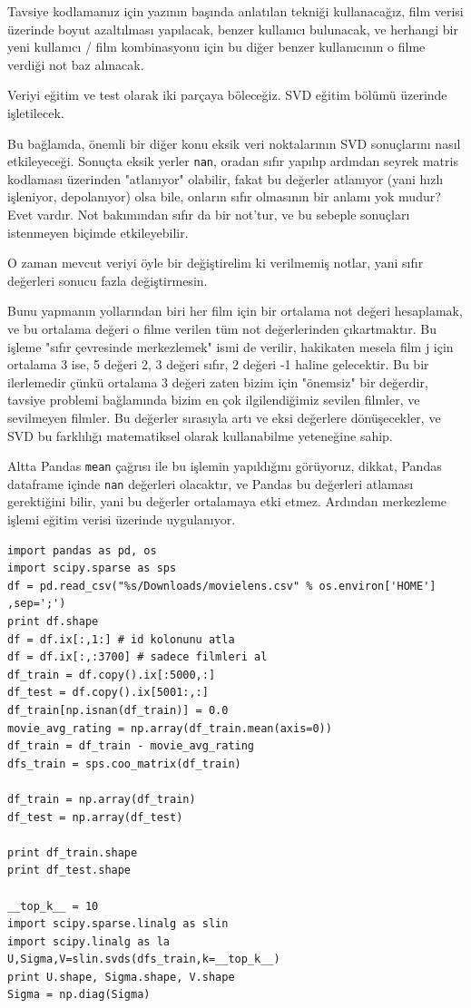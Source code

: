 \documentclass[12pt,fleqn]{article}\usepackage{../../common}
\begin{document}
Tavsiye kodlamamız için yazının başında anlatılan tekniği kullanacağız, film
verisi üzerinde boyut azaltılması yapılacak, benzer kullanıcı bulunacak, ve
herhangi bir yeni kullanıcı / film kombinasyonu için bu diğer benzer
kullanıcının o filme verdiği not baz alınacak.

Veriyi eğitim ve test olarak iki parçaya böleceğiz. SVD eğitim bölümü
üzerinde işletilecek.

Bu bağlamda, önemli bir diğer konu eksik veri noktalarının SVD
sonuçlarını nasıl etkileyeceği. Sonuçta eksik yerler \verb!nan!,
oradan sıfır yapılıp ardından seyrek matris kodlaması üzerinden
"atlanıyor" olabilir, fakat bu değerler atlanıyor (yani hızlı
işleniyor, depolanıyor) olsa bile, onların sıfır olmasının bir anlamı
yok mudur? Evet vardır. Not bakımından sıfır da bir not'tur, ve bu
sebeple sonuçları istenmeyen biçimde etkileyebilir.

O zaman mevcut veriyi öyle bir değiştirelim ki verilmemiş notlar, yani
sıfır değerleri sonucu fazla değiştirmesin.

Bunu yapmanın yollarından biri her film için bir ortalama not değeri
hesaplamak, ve bu ortalama değeri o filme verilen tüm not
değerlerinden çıkartmaktır. Bu işleme "sıfır çevresinde merkezlemek"
ismi de verilir, hakikaten mesela film j için ortalama 3 ise, 5 değeri
2, 3 değeri sıfır, 2 değeri -1 haline gelecektir. Bu bir ilerlemedir
çünkü ortalama 3 değeri zaten bizim için "önemsiz" bir değerdir,
tavsiye problemi bağlamında bizim en çok ilgilendiğimiz sevilen
filmler, ve sevilmeyen filmler. Bu değerler sırasıyla artı ve eksi
değerlere dönüşecekler, ve SVD bu farklılığı matematiksel olarak
kullanabilme yeteneğine sahip.

Altta Pandas \verb!mean! çağrısı ile bu işlemin yapıldığını görüyoruz, dikkat,
Pandas dataframe içinde \verb!nan! değerleri olacaktır, ve Pandas bu değerleri
atlaması gerektiğini bilir, yani bu değerler ortalamaya etki etmez. Ardından
merkezleme işlemi eğitim verisi üzerinde uygulanıyor.

\begin{verbatim}
import pandas as pd, os
import scipy.sparse as sps
df = pd.read_csv("%s/Downloads/movielens.csv" % os.environ['HOME'] ,sep=';')
print df.shape
df = df.ix[:,1:] # id kolonunu atla
df = df.ix[:,:3700] # sadece filmleri al
df_train = df.copy().ix[:5000,:]
df_test = df.copy().ix[5001:,:]
df_train[np.isnan(df_train)] = 0.0
movie_avg_rating = np.array(df_train.mean(axis=0))
df_train = df_train - movie_avg_rating
dfs_train = sps.coo_matrix(df_train)

df_train = np.array(df_train)
df_test = np.array(df_test)

print df_train.shape
print df_test.shape

__top_k__ = 10
import scipy.sparse.linalg as slin
import scipy.linalg as la
U,Sigma,V=slin.svds(dfs_train,k=__top_k__)
print U.shape, Sigma.shape, V.shape
Sigma = np.diag(Sigma)
\end{verbatim}
\end{document}
